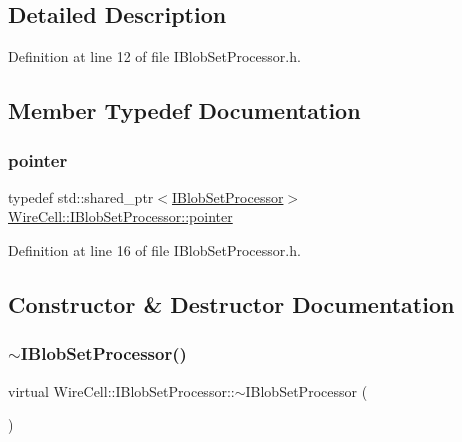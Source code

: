 \subsection{Detailed Description}


Definition at line 12 of file I\+Blob\+Set\+Processor.\+h.



\subsection{Member Typedef Documentation}
\mbox{\label{class_wire_cell_1_1_i_blob_set_processor_a4e2313738ab615ebf8c64895e1a6f3cc}} 
\subsubsection{\texorpdfstring{pointer}{pointer}}
{\footnotesize\ttfamily typedef std\+::shared\+\_\+ptr$<$\hyperlink{class_wire_cell_1_1_i_blob_set_processor}{I\+Blob\+Set\+Processor}$>$ \hyperlink{class_wire_cell_1_1_i_blob_set_processor_a4e2313738ab615ebf8c64895e1a6f3cc}{Wire\+Cell\+::\+I\+Blob\+Set\+Processor\+::pointer}}



Definition at line 16 of file I\+Blob\+Set\+Processor.\+h.



\subsection{Constructor \& Destructor Documentation}
\mbox{\label{class_wire_cell_1_1_i_blob_set_processor_a91d0fdcdc0740f4cec3b69a764b2f248}} 
\subsubsection{\texorpdfstring{$\sim$\+I\+Blob\+Set\+Processor()}{~IBlobSetProcessor()}}
{\footnotesize\ttfamily virtual Wire\+Cell\+::\+I\+Blob\+Set\+Processor\+::$\sim$\+I\+Blob\+Set\+Processor (\begin{DoxyParamCaption}{ }\end{DoxyParamCaption})\hspace{0.3cm}{\ttfamily [virtual]}}



